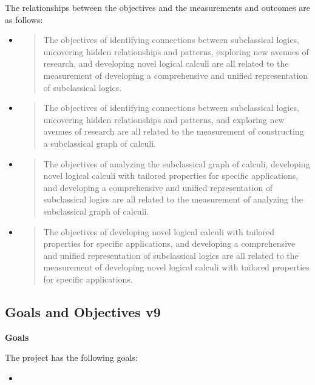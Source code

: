 The relationships between the objectives and the measurements and
outcomes are as follows:

\begin{itemize}
\item
  \begin{quote}
  The objectives of identifying connections between subclassical logics,
  uncovering hidden relationships and patterns, exploring new avenues of
  research, and developing novel logical calculi are all related to the
  measurement of developing a comprehensive and unified representation
  of subclassical logics.
  \end{quote}
\item
  \begin{quote}
  The objectives of identifying connections between subclassical logics,
  uncovering hidden relationships and patterns, and exploring new
  avenues of research are all related to the measurement of constructing
  a subclassical graph of calculi.
  \end{quote}
\item
  \begin{quote}
  The objectives of analyzing the subclassical graph of calculi,
  developing novel logical calculi with tailored properties for specific
  applications, and developing a comprehensive and unified
  representation of subclassical logics are all related to the
  measurement of analyzing the subclassical graph of calculi.
  \end{quote}
\item
  \begin{quote}
  The objectives of developing novel logical calculi with tailored
  properties for specific applications, and developing a comprehensive
  and unified representation of subclassical logics are all related to
  the measurement of developing novel logical calculi with tailored
  properties for specific applications.
  \end{quote}
\end{itemize}

\hypertarget{goals-and-objectives-v9}{%
\subsection{Goals and Objectives v9}\label{goals-and-objectives-v9}}

\textbf{Goals}

The project has the following goals:

\begin{itemize}
\tightlist
\item
\end{itemize}

